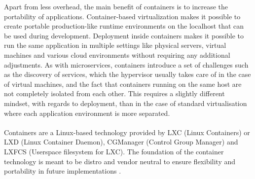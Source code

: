 \noindent
Apart from less overhead, the main benefit of containers is to increase the portability of applications. Container-based virtualization makes it possible to create portable production-like runtime environments on the localhost that can be used during development. Deployment inside containers makes it possible to run the same application in multiple settings like physical servers, virtual machines and various cloud environments without requiring any additional adjustments. As with microservices, containers introduce a set of challenges such as the discovery of services, which the hypervisor usually takes care of in the case of virtual machines, and the fact that containers running on the same host are not completely isolated from each other. This requires a slightly different mindset, with regards to deployment, than in the case of standard virtualisation where each application environment is more separated.
\\ \\
Containers are a Linux-based technology provided by LXC (Linux Containers) or LXD (Linux Container Daemon), CGManager (Control Group Manager) and LXFCS (Userspace filesystem for LXC). The foundation of the container technology is meant to be distro and vendor neutral to ensure flexibility and portability in future implementations \cite{linuxContainers}.


